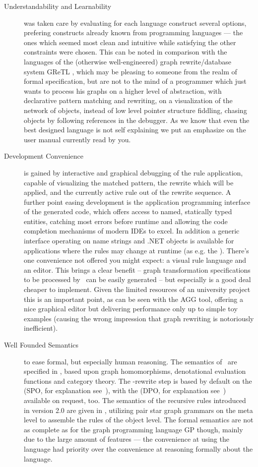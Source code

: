 \begin{description}
\item[Understandability and Learnability]
was taken care by evaluating for each language construct several options,
prefering constructs already known from programming languages ---
the ones which seemed most clean and intuitive while satisfying the other constraints were chosen.
This can be noted in comparison with the languages of the (otherwise well-engineered) graph rewrite/database system GReTL \cite{GReTL},
which may be pleasing to someone from the realm of formal specification, but are not to the mind of a programmer which just wants to process his graphs on a higher level of abstraction, with declarative pattern matching and rewriting, on a visualization of the network of objects, instead of low level pointer structure fiddling, chasing objects by following references in the debugger.
As we know that even the best designed language is not self explaining we put an emphasize on the user manual currently read by you.

\item[Development Convenience]
is gained by interactive and graphical debugging of the rule application, capable of visualizing the matched pattern, the rewrite which will be applied, and the currently active rule out of the rewrite sequence.
A further point easing development is the application programming interface of the generated code,
which offers access to named, statically typed entities, catching most errors before runtime and allowing the code completion mechanisms of modern IDEs to excel.
In addition a generic interface operating on name strings and .NET objects is available for applications where the rules may change at runtime (as e.g. the \GrShell).
There's one convenience not offered you might expect: a visual rule language and an editor.
This brings a clear benefit -- graph transformation specifications to be processed by \GrG\ can be easily generated --
but especially is a good deal cheaper to implement. Given the limited resources of an university project this is an important point,
as can be seen with the AGG\cite{agg} tool, offering a nice graphical editor but delivering performance only up to simple toy examples
(causing the wrong impression that graph rewriting is notoriously inefficient).

\item[Well Founded Semantics]
to ease formal, but especially human reasoning.
The semantics of \GrG\ are specified in \cite{DissRuby}, based upon graph homomorphisms, denotational evaluation functions and category theory.
The \GrG-rewrite step is based by default on the  (SPO, for explanation see~\cite{spoapproach}),
with the  (DPO, for explanation see~\cite{dpoapproach}) available on request, too.
The semantics of the recursive rules introduced in version 2.0 are given in \cite{Jak:08},
utilizing pair star graph grammars on the meta level to assemble the rules of the object level.
The formal semantics are not as complete as for the graph programming language GP\cite{gp} though, mainly due to the large amount of features
--- the convenience at using the language had priority over the convenience at reasoning formally about the language.


\end{description}
